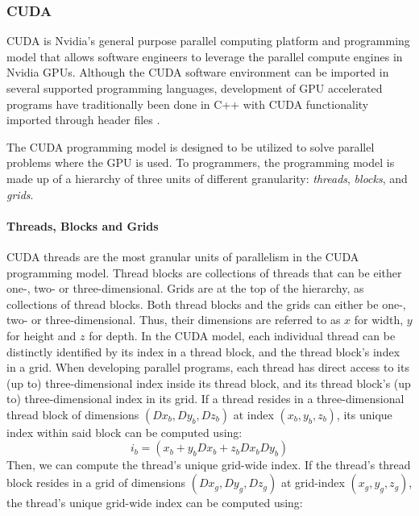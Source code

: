 \subsubsection{CUDA} \label{background:graphical_processing_units:cuda}

CUDA \cite{cuda} is Nvidia's general purpose parallel computing platform and programming model that allows software engineers to leverage the parallel compute engines in Nvidia GPUs.
Although the CUDA software environment can be imported in several supported programming languages, development of GPU accelerated programs have traditionally been done in C++ with CUDA functionality imported through header files \cite{cuda}.

The CUDA programming model is designed to be utilized to solve parallel problems where the GPU is used.
To programmers, the programming model is made up of a hierarchy of three units of different granularity: \textit{threads}, \textit{blocks}, and \textit{grids}.

\paragraph{Threads, Blocks and Grids}
CUDA threads are the most granular units of parallelism in the CUDA programming model.
Thread blocks are collections of threads that can be either one-, two- or three-dimensional.
Grids are at the top of the hierarchy, as collections of thread blocks.
Both thread blocks and the grids can either be one-, two- or three-dimensional.
Thus, their dimensions are referred to as $x$ for width, $y$ for height and $z$ for depth.
In the CUDA model, each individual thread can be distinctly identified by its index in a thread block, and the thread block's index in a grid.
When developing parallel programs, each thread has direct access to its (up to) three-dimensional index inside its thread block, and its thread block's (up to) three-dimensional index in its grid.
If a thread resides in a three-dimensional thread block of dimensions $(Dx_b, Dy_b, Dz_b)$ at index $(x_b, y_b, z_b)$, its unique index within said block can be computed using:
\begin{equation}
  i_b = (x_b + y_bDx_b + z_bDx_bDy_b)
\end{equation}
Then, we can compute the thread's unique grid-wide index.
If the thread's thread block resides in a grid of dimensions $(Dx_g, Dy_g, Dz_g)$ at grid-index $(x_g, y_g, z_g)$, the thread's unique grid-wide index can be computed using:

